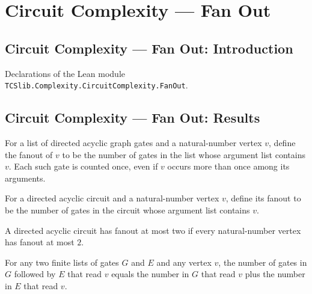 \section{Circuit Complexity --- Fan Out}
\subsection*{Circuit Complexity --- Fan Out: Introduction}

Declarations of the Lean module \texttt{TCSlib.Complexity.CircuitComplexity.FanOut}.

\subsection*{Circuit Complexity --- Fan Out: Results}

\begin{definition}
\label{BoolCircuit.fanoutIn}
\leanok
{}
For a list of directed acyclic graph gates and a natural-number vertex $v$, define the
fanout of $v$ to be the number of gates in the list whose argument list contains $v$.
Each such gate is counted once, even if $v$ occurs more than once among its arguments.
\end{definition}

\begin{definition}
\label{BoolCircuit.DAGCircuit.fanout}
\leanok
{}
For a directed acyclic circuit and a natural-number vertex $v$, define its fanout to be
the number of gates in the circuit whose argument list contains $v$.
\end{definition}

\begin{definition}
\label{BoolCircuit.DAGCircuit.HasFanoutTwo}
\leanok
{}
A directed acyclic circuit has fanout at most two if every natural-number vertex has
fanout at most $2$.
\end{definition}

\begin{theorem}
\label{BoolCircuit.fanoutIn_append}
\leanok
{}
For any two finite lists of gates $G$ and $E$ and any vertex $v$, the number of gates in
$G$ followed by $E$ that read $v$ equals the number in $G$ that read $v$ plus the number
in $E$ that read $v$.
\end{theorem}

